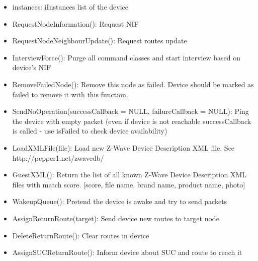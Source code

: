 \begin {itemize}
\begin {itemize}
\begin {itemize}
\item neightbours: list of neighbour nodes

\item givenName: name for Expert UI
\item isFailed: is failed
\item failureCount: number of tries since last device failed
\item lastRecevied: timestamp of last packet received
\item lastSend: timestamp of last sent operation
\item lastPacketInfo: structure with deliveryTime, delivered and packetLength information about last packet sent
\item queueLength: length of device specific send queue (if countJobs is enabled)
\item lastNonceGet: internal
\end {itemize}

\item instances: iInstances list of the device
\item RequestNodeInformation(): Request NIF
\item RequestNodeNeighbourUpdate(): Request routes update
\item InterviewForce(): Purge all command classes and start interview based on device's NIF
\item RemoveFailedNode(): Remove this node as failed. Device should be marked as failed to remove it with this function.
\item SendNoOperation(successCallback = NULL, failureCallback = NULL): Ping the device with empty packet (even if device is not reachable successCallback is called - use isFailed to check device availability)
\item LoadXMLFile(file): Load new Z-Wave Device Description XML file. See http://pepper1.net/zwavedb/
\item GuestXML(): Return the list of all known Z-Wave Device Description XML files with match score. [score, file name, brand name, product name, photo]
\item WakeupQueue(): Pretend the device is awake and try to send packets
\item AssignReturnRoute(target): Send device new routes to target node
\item DeleteReturnRoute(): Clear routes in device
\item AssignSUCReturnRoute(): Inform device about SUC and route to reach it
\end {itemize}
\end {itemize}

